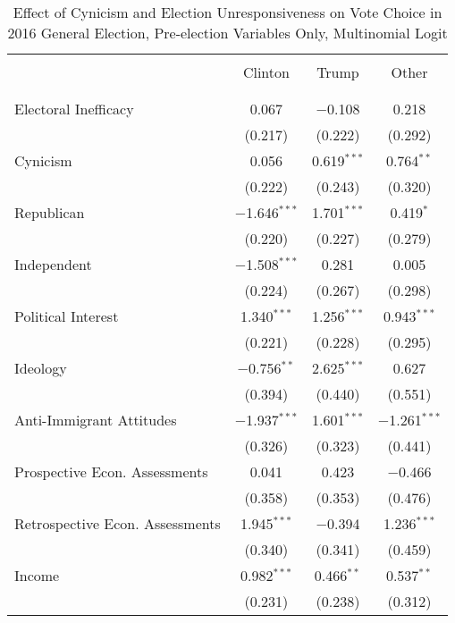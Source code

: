 \documentclass[12pt]{article}
\begin{document}
\begin{appendices}
\begin{refsection}
\begin{table}[!t] \centering 
  \caption{Effect of Cynicism and Election Unresponsiveness on Vote Choice in 2016 General Election, Pre-election Variables Only, Multinomial Logit} 
  \label{tab:general-pre} 
   \renewcommand{\arraystretch}{1}
\begin{adjustbox}{width=0.6\textwidth,center}
\begin{tabular}{@{\extracolsep{5pt}}lccc} 
\\[-1.8ex]\hline 
 \\[-2ex] 
 & Clinton & Trump & Other \\ 
\hline \\[-1.8ex] 
\hline \\[-1.8ex] 
 Electoral Inefficacy & 0.067 & $-$0.108 & 0.218 \\ 
  & (0.217) & (0.222) & (0.292) \\ 
 Cynicism & 0.056 & 0.619$^{***}$ & 0.764$^{**}$ \\ 
  & (0.222) & (0.243) & (0.320) \\ 
 Republican & $-$1.646$^{***}$ & 1.701$^{***}$ & 0.419$^{*}$ \\ 
  & (0.220) & (0.227) & (0.279) \\ 
 Independent & $-$1.508$^{***}$ & 0.281 & 0.005 \\ 
  & (0.224) & (0.267) & (0.298) \\ 
 Political Interest & 1.340$^{***}$ & 1.256$^{***}$ & 0.943$^{***}$ \\ 
  & (0.221) & (0.228) & (0.295) \\ 
 Ideology & $-$0.756$^{**}$ & 2.625$^{***}$ & 0.627 \\ 
  & (0.394) & (0.440) & (0.551) \\ 
 Anti-Immigrant Attitudes & $-$1.937$^{***}$ & 1.601$^{***}$ & $-$1.261$^{***}$ \\ 
  & (0.326) & (0.323) & (0.441) \\ 
 Prospective Econ. Assessments & 0.041 & 0.423 & $-$0.466 \\ 
  & (0.358) & (0.353) & (0.476) \\ 
 Retrospective Econ. Assessments & 1.945$^{***}$ & $-$0.394 & 1.236$^{***}$ \\ 
  & (0.340) & (0.341) & (0.459) \\ 
 Income & 0.982$^{***}$ & 0.466$^{**}$ & 0.537$^{**}$ \\ 
  & (0.231) & (0.238) & (0.312) \\ 

\end{tabular}
\end{adjustbox}
\end{table}
\end{refsection}
\end{appendices}
\end{document}
